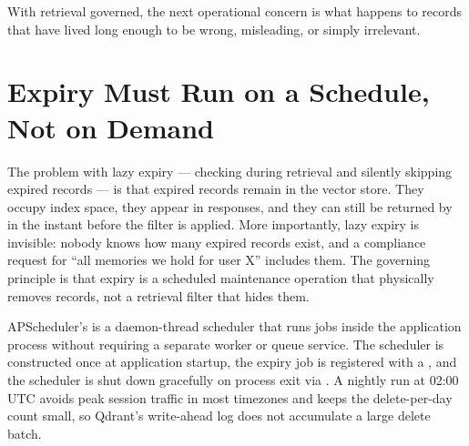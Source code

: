 With retrieval governed, the next operational concern is what happens to
records that have lived long enough to be wrong, misleading, or simply
irrelevant.

\section{Expiry Must Run on a Schedule, Not on Demand}
\label{sec:ttl-expiry}

The problem with lazy expiry --- checking  during
retrieval and silently skipping expired records --- is that expired records
remain in the vector store. They occupy index space, they appear in
 responses, and they can still be returned by
 in the instant before the filter is applied. More
importantly, lazy expiry is invisible: nobody knows how many expired records
exist, and a compliance request for ``all memories we hold for user X''
includes them. The governing principle is that expiry is a scheduled
maintenance operation that physically removes records, not a retrieval
filter that hides them.

APScheduler's  is a daemon-thread scheduler that
runs jobs inside the application process without requiring a separate worker
or queue service. The scheduler is constructed once at application startup,
the expiry job is registered with a , and the scheduler is
shut down gracefully on process exit via . A nightly run at
02:00 UTC avoids peak session traffic in most timezones and keeps the
delete-per-day count small, so Qdrant's write-ahead log does not accumulate
a large delete batch.

